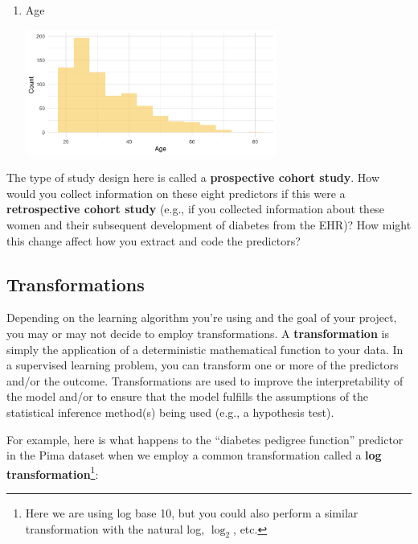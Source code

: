 \begin{question}{}
\begin{enumerate}
\begin{center}
    \end{center}
    \newpage
  \item Age
    \begin{center}
    \includegraphics[width=0.65\textwidth]{img/pima-age.png}
    \end{center}
  \end{enumerate}
\end{question}

\begin{question}{}
The type of study design here is called a \textbf{prospective cohort study}. How would you collect information on these eight predictors if this were a \textbf{retrospective cohort study} (e.g., if you collected information about these women and their subsequent development of diabetes from the EHR)? How might this change affect how you extract and code the predictors? 
\end{question}

\subsection{Transformations}

Depending on the learning algorithm you're using and the goal of your project, you may or may not decide to employ transformations. A \textbf{transformation} is simply the application of a deterministic mathematical function to your data. In a supervised learning problem, you can transform one or more of the predictors and/or the outcome. Transformations are used to improve the interpretability of the model and/or to ensure that the model fulfills the assumptions of the statistical inference method(s) being used (e.g., a hypothesis test).

For example, here is what happens to the ``diabetes pedigree function'' predictor in the Pima dataset when we employ a common transformation called a \textbf{log transformation}\footnote{Here we are using log base 10, but you could also perform a similar transformation with the natural log, $\log_2$, etc.}:

